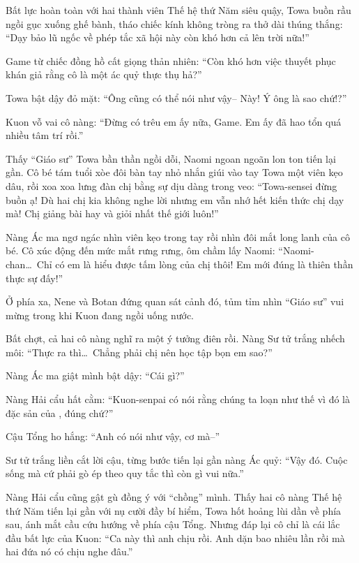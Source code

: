 \documentclass[../main.tex]{subfiles}
\begin{document}
\omk

Bất lực hoàn toàn với hai thành viên Thế hệ thứ Năm siêu quậy, Towa buồn rầu ngồi gục xuống ghế bành, tháo chiếc kính không tròng ra thở dài thúng thắng: ``Dạy bảo lũ ngốc về phép tắc xã hội này còn khó hơn cả lên trời nữa!''


Game từ chiếc đồng hồ cất giọng thản nhiên: ``Còn khó hơn việc thuyết phục khán giả rằng cô là một ác quỷ thực thụ hả?''

Towa bật dậy đỏ mặt: ``Ông cũng có thể nói như vậy-- Này! Ý ông là sao chứ!?''

Kuon vỗ vai cô nàng: ``Đừng có trêu em ấy nữa, Game. Em ấy đã hao tổn quá nhiều tâm trí rồi.''

Thấy ``Giáo sư'' Towa bần thần ngồi dỗi, Naomi ngoan ngoãn lon ton tiến lại gần. Cô bé tám tuổi xòe đôi bàn tay nhỏ nhắn giúi vào tay Towa một viên kẹo dâu, rồi xoa xoa lưng đàn chị bằng sự dịu dàng trong veo: ``Towa-sensei đừng buồn ạ! Dù hai chị kia không nghe lời nhưng em vẫn nhớ hết kiến thức chị dạy mà! Chị giảng bài hay và giỏi nhất thế giới luôn!''

Nàng Ác ma ngơ ngác nhìn viên kẹo trong tay rồi nhìn đôi mắt long lanh của cô bé. Cô xúc động đến mức mắt rưng rưng, ôm chầm lấy Naomi: ``Naomi-chan\dots\ Chỉ có em là hiểu được tấm lòng của chị thôi! Em mới đúng là thiên thần thực sự đấy!''

Ở phía xa, Nene và Botan đứng quan sát cảnh đó, tủm tỉm nhìn ``Giáo sư'' vui mừng trong khi Kuon đang ngồi uống nước.

Bất chợt, cả hai cô nàng nghĩ ra một ý tưởng điên rồi. Nàng Sư tử trắng nhếch môi: ``Thực ra thì\dots\ Chẳng phải chị nên học tập bọn em sao?''

Nàng Ác ma giật mình bật dậy: ``Cái gì?''

Nàng Hải cẩu hất cằm: ``Kuon-senpai có nói rằng chúng ta loạn như thế vì đó là đặc sản của \hll, đúng chứ?''

Cậu Tổng ho hắng: ``Anh có nói như vậy, cơ mà--''

Sư tử trắng liền cắt lời cậu, từng bước tiến lại gần nàng Ác quỷ: ``Vậy đó. Cuộc sống mà cứ phải gò ép theo quy tắc thì còn gì vui nữa.''

Nàng Hải cẩu cũng gật gù đồng ý với ``chồng'' mình. Thấy hai cô nàng Thế hệ thứ Năm tiến lại gần với nụ cười đầy bí hiểm, Towa hốt hoảng lùi dần về phía sau, ánh mắt cầu cứu hướng về phía cậu Tổng. Nhưng đáp lại cô chỉ là cái lắc đầu bất lực của Kuon: ``Ca này thì anh chịu rồi. Anh dặn bao nhiêu lần rồi mà hai đứa nó có chịu nghe đâu.''
\end{document}
